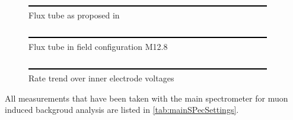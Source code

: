     
  \begin{figure}
	\includegraphics[width = 0.9 \textwidth]{graphics/dummy.eps}
	\caption[Flux tube P12.M8]{Flux tube as proposed in \cite{proposalM12}}
  	\label{fig:newFluxTube}
  \end{figure}
  
  \begin{figure}
	\caption[Flux tube M12.8]{Flux tube in field configuration M12.8}
  	\includegraphics[width = 0.9 \textwidth]{graphics/dummy.eps}
  \end{figure}
  
  \begin{figure}
  	\caption[Inner electrode field emission]{Rate trend over inner electrode voltages}
  	\includegraphics[width = 0.9 \textwidth]{graphics/dummy.eps}
  \end{figure}

  
All measurements that have been taken with the main spectrometer for muon induced backgroud analysis are listed in \ref{tab:mainSPecSettings}.

